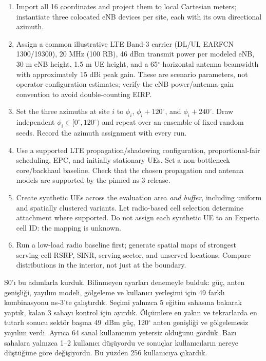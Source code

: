 \documentclass[11pt,a4paper]{article}
\newenvironment{progress}{\par\smallskip\color{blue}}{\par\smallskip}
\begin{document}
\begin{enumerate}[leftmargin=*,itemsep=2pt]
\item Import all 16 coordinates and project them to local Cartesian meters; instantiate three colocated eNB devices per site, each with its own directional azimuth.
\item Assign a common illustrative LTE Band-3 carrier (DL/UL EARFCN 1300/19300), 20 MHz (100 RB), 46 dBm transmit power per modeled eNB, 30 m eNB height, 1.5 m UE height, and a 65$^\circ$ horizontal antenna beamwidth with approximately 15 dBi peak gain. These are scenario parameters, not operator configuration estimates; verify the eNB power/antenna-gain convention to avoid double-counting EIRP.
\item Set the three azimuths at site $i$ to $\phi_i$, $\phi_i+120^\circ$, and $\phi_i+240^\circ$. Draw independent $\phi_i\in[0^\circ,120^\circ)$ and repeat over an ensemble of fixed random seeds. Record the azimuth assignment with every run.
\item Use a supported LTE propagation/shadowing configuration, proportional-fair scheduling, EPC, and initially stationary UEs. Set a non-bottleneck core/backhaul baseline. Check that the chosen propagation and antenna models are supported by the pinned ns-3 release.
\item Create synthetic UEs across the evaluation area \emph{and buffer}, including uniform and spatially clustered variants. Let radio-based cell selection determine attachment where supported. Do not assign each synthetic UE to an Experia cell ID: the mapping is unknown.
\item Run a low-load radio baseline first; generate spatial maps of strongest serving-cell RSRP, SINR, serving sector, and unserved locations. Compare distributions in the interior, not just at the boundary.
\end{enumerate}

\begin{progress}
S0'ı bu adımlarla kurduk. Bilinmeyen ayarları denemeyle bulduk: güç, anten genişliği, yayılım modeli, gölgeleme ve kullanıcı yerleşimi için 49 farklı kombinasyonu ns-3'te çalıştırdık. Seçimi yalnızca 5 eğitim sahasına bakarak yaptık, kalan 3 sahayı kontrol için ayırdık. Ölçümlere en yakın ve tekrarlarda en tutarlı sonucu sektör başına 49~dBm güç, 120$^\circ$ anten genişliği ve gölgelemesiz yayılım verdi. Ayrıca 64 sanal kullanıcının yetersiz olduğunu gördük. Bazı sahalara yalnızca 1--2 kullanıcı düşüyordu ve sonuçlar kullanıcıların nereye düştüğüne göre değişiyordu. Bu yüzden 256 kullanıcıya çıkardık.
\end{progress}
\end{document}
